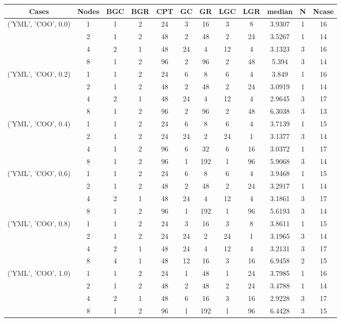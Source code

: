 \begin{tabular}{cccccccccccc}
\hline
Cases & Nodes& BGC& BGR& CPT& GC& GR& LGC& LGR& median & N & Ncase \\
\hline
\multirow{4}{*}{('YML', 'COO', 0.0)}& 1& 1& 2& 24& 3& 16& 3& 8& 3.9307& 1& 16\\
& 2& 1& 2& 48& 2& 48& 2& 24& 3.5267& 1& 14\\
& 4& 2& 1& 48& 24& 4& 12& 4& 3.1323& 3& 16\\
& 8& 1& 2& 96& 2& 96& 2& 48& 5.394& 3& 14\\
\hline
\multirow{4}{*}{('YML', 'COO', 0.2)}& 1& 1& 2& 24& 6& 8& 6& 4& 3.849& 1& 16\\
& 2& 1& 2& 48& 2& 48& 2& 24& 3.0919& 1& 14\\
& 4& 2& 1& 48& 24& 4& 12& 4& 2.9645& 3& 17\\
& 8& 1& 2& 96& 2& 96& 2& 48& 6.3038& 3& 13\\
\hline
\multirow{4}{*}{('YML', 'COO', 0.4)}& 1& 1& 2& 24& 6& 8& 6& 4& 3.7139& 1& 15\\
& 2& 1& 2& 24& 24& 2& 24& 1& 3.1377& 3& 14\\
& 4& 1& 2& 96& 6& 32& 6& 16& 3.0372& 1& 17\\
& 8& 1& 2& 96& 1& 192& 1& 96& 5.9068& 3& 14\\
\hline
\multirow{4}{*}{('YML', 'COO', 0.6)}& 1& 1& 2& 24& 6& 8& 6& 4& 3.9468& 1& 15\\
& 2& 1& 2& 48& 2& 48& 2& 24& 3.2917& 1& 14\\
& 4& 2& 1& 48& 24& 4& 12& 4& 3.1861& 3& 17\\
& 8& 1& 2& 96& 1& 192& 1& 96& 5.6193& 3& 14\\
\hline
\multirow{4}{*}{('YML', 'COO', 0.8)}& 1& 1& 2& 24& 3& 16& 3& 8& 3.8611& 1& 15\\
& 2& 1& 2& 24& 24& 2& 24& 1& 3.1965& 3& 14\\
& 4& 2& 1& 48& 24& 4& 12& 4& 3.2131& 3& 17\\
& 8& 4& 1& 48& 12& 16& 3& 16& 6.9458& 2& 15\\
\hline
\multirow{4}{*}{('YML', 'COO', 1.0)}& 1& 1& 2& 24& 1& 48& 1& 24& 3.7985& 1& 16\\
& 2& 1& 2& 48& 2& 48& 2& 24& 3.4788& 1& 14\\
& 4& 2& 1& 48& 6& 16& 3& 16& 2.9228& 3& 17\\
& 8& 1& 2& 96& 1& 192& 1& 96& 6.4428& 3& 15\\
\hline
\end{tabular}
